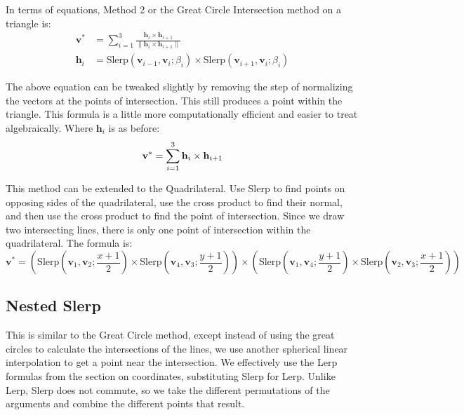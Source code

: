 \documentclass{amsart}[12pt]
\begin{document}
In terms of equations, Method 2 or the Great Circle Intersection
method on a triangle is:
\begin{equation}\begin{split}%
\mathbf v^* & = \sum^3_{i=1} \frac{\mathbf h_i \times \mathbf h_{i+1}}
{\|\mathbf h_i \times \mathbf h_{i+1}\|} \\
\mathbf h_i & =
\mathrm{Slerp}(\mathbf v_{i-1}, \mathbf v_i; \beta_{i})
\times
\mathrm{Slerp}(\mathbf v_{i+1}, \mathbf v_i; \beta_{i})
\end{split}\end{equation}

The above equation can be tweaked slightly by removing the step of normalizing
the vectors at the points of intersection. This still produces a point within
the triangle. This formula is a little more computationally efficient and
easier to treat algebraically. Where $\mathbf h_i$ is as before:
\begin{equation}\label{eq:gct}%
\mathbf v^* = \sum^3_{i=1} \mathbf h_i \times \mathbf h_{i+1} \\
\end{equation}

This method can be extended to the Quadrilateral. Use Slerp to find points on
opposing sides of the quadrilateral, use the cross product to find their
normal, and then use the cross product to find the point of intersection. Since
we draw two intersecting lines, there is only one point of intersection within
the quadrilateral. The formula is:
\begin{equation}\label{eq:gcq}%
\mathbf v^* =
(\mathrm{Slerp}(\mathbf v_1, \mathbf v_2; \frac{x+1}{2})
\times
\mathrm{Slerp}(\mathbf v_4, \mathbf v_3; \frac{y+1}{2}))
\times
(\mathrm{Slerp}(\mathbf v_1, \mathbf v_4; \frac{y+1}{2})
\times
\mathrm{Slerp}(\mathbf v_2, \mathbf v_3; \frac{x+1}{2}))
\end{equation}

\subsection{Nested Slerp}
This is similar to the Great Circle method, except instead of using the great
circles to calculate the intersections of the lines, we use another spherical
linear interpolation to get a point near the intersection. We effectively use
the Lerp formulas from the section on coordinates, substituting Slerp for Lerp.
Unlike Lerp, Slerp does not commute, so we take the different permutations of
the arguments and combine the different points that result.
\end{document}
